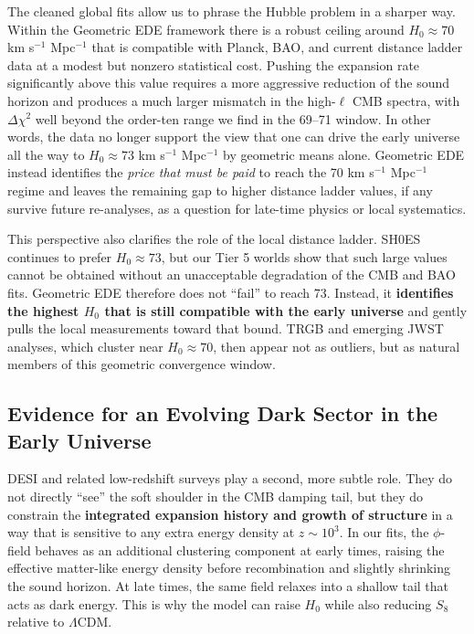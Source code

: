 \documentclass[a4paper,11pt]{article}
\begin{document}
The cleaned global fits allow us to phrase the Hubble problem in a sharper way. Within the Geometric EDE framework there is a robust ceiling around $H_0 \approx 70$ km s$^{-1}$ Mpc$^{-1}$ that is compatible with Planck, BAO, and current distance ladder data at a modest but nonzero statistical cost. Pushing the expansion rate significantly above this value requires a more aggressive reduction of the sound horizon and produces a much larger mismatch in the high-$\ell$ CMB spectra, with $\Delta\chi^2$ well beyond the order-ten range we find in the 69--71 window. In other words, the data no longer support the view that one can drive the early universe all the way to $H_0 \approx 73$ km s$^{-1}$ Mpc$^{-1}$ by geometric means alone. Geometric EDE instead identifies the \emph{price that must be paid} to reach the 70 km s$^{-1}$ Mpc$^{-1}$ regime and leaves the remaining gap to higher distance ladder values, if any survive future re-analyses, as a question for late-time physics or local systematics.

This perspective also clarifies the role of the local distance ladder. SH0ES continues to prefer $H_0 \approx 73$, but our Tier 5 worlds show that such large values cannot be obtained without an unacceptable degradation of the CMB and BAO fits. Geometric EDE therefore does not ``fail'' to reach 73. Instead, it \textbf{identifies the highest $H_0$ that is still compatible with the early universe} and gently pulls the local measurements toward that bound. TRGB and emerging JWST analyses, which cluster near $H_0 \approx 70$, then appear not as outliers, but as natural members of this geometric convergence window.

\subsection*{Evidence for an Evolving Dark Sector in the Early Universe}

DESI and related low-redshift surveys play a second, more subtle role. They do not directly ``see'' the soft shoulder in the CMB damping tail, but they do constrain the \textbf{integrated expansion history and growth of structure} in a way that is sensitive to any extra energy density at $z \sim 10^3$. In our fits, the $\phi$-field behaves as an additional clustering component at early times, raising the effective matter-like energy density before recombination and slightly shrinking the sound horizon. At late times, the same field relaxes into a shallow tail that acts as dark energy. This is why the model can raise $H_0$ while also reducing $S_8$ relative to $\Lambda$CDM.
\end{document}
